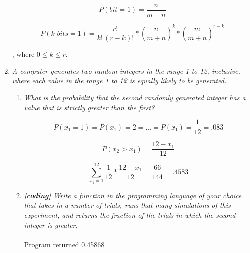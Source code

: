 \documentclass{article} %
\begin{document}
\begin{enumerate}
	$$P(bit = 1) = \frac{n}{m + n}$$
	
	$$P(k\,\,bits = 1) = \frac{r!}{k!\,(r-k)!} * (\frac{n}{m + n})^{k} * (\frac{m}{m + n})^{r - k}$$
	
	, where $0 \leq k \leq r$.
	
	\item \textit{A computer generates two random integers in the range 1 to 12, inclusive, where each value in the range 1 to 12 is equally likely to be generated.}
	\begin{enumerate}
		\item \textit{What is the probability that the second randomly generated integer has a value that is strictly greater than the first?}
		
		$$P(x_1 = 1) = P(x_1) = 2 = ... = P(x_1) = \frac{1}{12} = .083$$
		
		$$P(x_2 > x_1) = \frac{12 - x_1}{12}$$
		
		$$\sum_{x_1 = 1}^{12} \frac{1}{12} * \frac{12 - x_1}{12} = \frac{66}{144} = .4583$$
		
		\item \textit{\textbf{[coding]} Write a function in the programming language of your choice that takes in a number of trials, runs that many simulations of this experiment, and returns the fraction of the trials in which the second integer is greater.}\\
		\\
		Program returned 0.45868
	
	\end{enumerate}
	
\end{enumerate}
\end{document}
